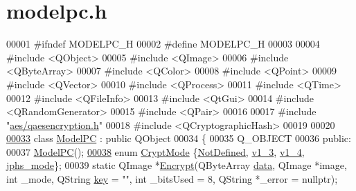 \hypertarget{modelpc_8h_source}{}\section{modelpc.\+h}

\begin{DoxyCode}
00001 \textcolor{preprocessor}{#ifndef MODELPC\_H}
00002 \textcolor{preprocessor}{#define MODELPC\_H}
00003 
00004 \textcolor{preprocessor}{#include <QObject>}
00005 \textcolor{preprocessor}{#include <QImage>}
00006 \textcolor{preprocessor}{#include <QByteArray>}
00007 \textcolor{preprocessor}{#include <QColor>}
00008 \textcolor{preprocessor}{#include <QPoint>}
00009 \textcolor{preprocessor}{#include <QVector>}
00010 \textcolor{preprocessor}{#include <QProcess>}
00011 \textcolor{preprocessor}{#include <QTime>}
00012 \textcolor{preprocessor}{#include <QFileInfo>}
00013 \textcolor{preprocessor}{#include <QtGui>}
00014 \textcolor{preprocessor}{#include <QRandomGenerator>}
00015 \textcolor{preprocessor}{#include <QPair>}
00016 
00017 \textcolor{preprocessor}{#include "\hyperlink{qaesencryption_8h}{aes/qaesencryption.h}"}
00018 \textcolor{preprocessor}{#include <QCryptographicHash>}
00019 
00020 
\hypertarget{modelpc_8h_source.tex_l00033}{}\hyperlink{class_model_p_c}{00033} \textcolor{keyword}{class }\hyperlink{class_model_p_c}{ModelPC} : \textcolor{keyword}{public} QObject
00034 \{
00035     Q\_OBJECT
00036 \textcolor{keyword}{public}:
00037     \hyperlink{class_model_p_c_ae12ebe65ec973c02a0de4850a7c1e31c}{ModelPC}();
\hypertarget{modelpc_8h_source.tex_l00038}{}\hyperlink{class_model_p_c_a296dd7afe3e1c49b3da25fd644fe4ceba43138df6b33a6b2bf608768907f95abc}{00038}     \textcolor{keyword}{enum} \hyperlink{class_model_p_c_a296dd7afe3e1c49b3da25fd644fe4ceb}{CryptMode} \{\hyperlink{class_model_p_c_a296dd7afe3e1c49b3da25fd644fe4ceba287198790ac9799acd03c99d63a6faea}{NotDefined}, \hyperlink{class_model_p_c_a296dd7afe3e1c49b3da25fd644fe4ceba7612e38de7178170655a56ddcf96e12c}{v1\_3}, \hyperlink{class_model_p_c_a296dd7afe3e1c49b3da25fd644fe4ceba43138df6b33a6b2bf608768907f95abc}{v1\_4}, \hyperlink{class_model_p_c_a296dd7afe3e1c49b3da25fd644fe4ceba90ca32d3ccbb6be224cdfc33f7096eea}{jphs\_mode}\};
00039     \textcolor{keyword}{static} QImage *\hyperlink{class_model_p_c_a271cf9285e32df58ffbfc918e6482bbd}{Encrypt}(QByteArray \hyperlink{namespace_errors_dict_setup_af570460846fb9f0c91abd308a095dcdc}{data}, QImage *image, \textcolor{keywordtype}{int} \_mode, QString 
      \hyperlink{namespace_errors_dict_setup_a09c268098d09ffb8e5504f30fa6d5dd9}{key} = \textcolor{stringliteral}{""}, \textcolor{keywordtype}{int} \_bitsUsed = 8, QString *\_error = \textcolor{keyword}{nullptr});

\end{DoxyCode}
